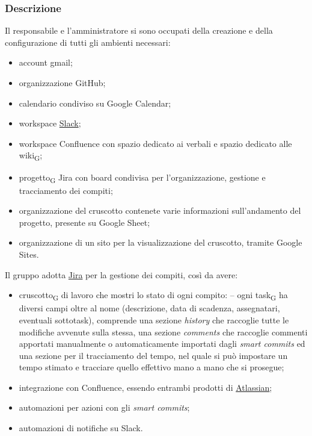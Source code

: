     \subsubsection{Descrizione}
    Il responsabile e l'amministratore si sono occupati della creazione e della configurazione di tutti gli ambienti necessari:
    \begin{itemize}
        \item account gmail;
        \item organizzazione GitHub;
        \item calendario condiviso su Google Calendar;
        \item workspace \href{https://slack.com/intl/en-it/about}{Slack};
        \item workspace Confluence con spazio dedicato ai verbali e spazio dedicato alle wiki\textsubscript{G};
        \item progetto\textsubscript{G} Jira con board condivisa per l'organizzazione, gestione e tracciamento dei compiti;
        \item organizzazione del cruscotto contenete varie informazioni sull'andamento del progetto, presente su Google Sheet;
        \item organizzazione di un sito per la visualizzazione del cruscotto, tramite Google Sites.
    \end{itemize}
        Il gruppo adotta \href{https://www.atlassian.com/software/jira}{Jira} per la gestione dei compiti, così da avere:
        \begin{itemize}
            \item cruscotto\textsubscript{G} di lavoro che mostri lo stato di ogni compito:
                \subitem -- ogni task\textsubscript{G} ha diversi campi oltre al nome (descrizione, data di scadenza, assegnatari, eventuali sottotask), comprende una sezione \textit{history} che raccoglie tutte le modifiche avvenute sulla stessa, una sezione \textit{comments} che raccoglie commenti apportati manualmente o automaticamente importati dagli \textit{smart commits} ed una sezione per il tracciamento del tempo, nel quale si può impostare un tempo stimato e tracciare quello effettivo mano a mano che si prosegue;
            \item integrazione con Confluence, essendo entrambi prodotti di \href{https://www.atlassian.com/}{Atlassian};
            \item automazioni per azioni con gli \textit{smart commits};
            \item automazioni di notifiche su Slack.
        \end{itemize}
